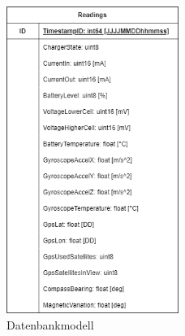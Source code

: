 \begin{figure}
    \centering
    \includegraphics[width=0.5\textwidth]{pics/datenbankmodell.png}
    \caption{Datenbankmodell}
    \label{fig. Datenbankmodell}
\end{figure}
